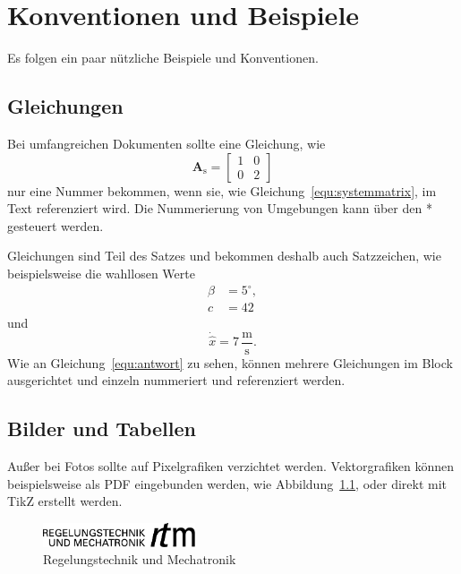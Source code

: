 \chapter{Konventionen und Beispiele}
Es folgen ein paar nützliche Beispiele und Konventionen.

\section{Gleichungen} \label{sec:gleichungen}
Bei umfangreichen Dokumenten sollte eine Gleichung, wie
%
\begin{equation} \label{equ:systemmatrix}
	\mathbf{A}_\mathrm{s} = \begin{bmatrix}1 & 0 \\ 0 & 2\end{bmatrix}
\end{equation}
%
nur eine Nummer bekommen, wenn sie, wie Gleichung~\eqref{equ:systemmatrix}, im Text referenziert wird. Die Nummerierung von Umgebungen kann über den * gesteuert werden.

Gleichungen sind Teil des Satzes und bekommen deshalb auch Satzzeichen, wie beispielsweise die wahllosen Werte
%
\begin{align}
	\beta &= 5^{\circ}, \nonumber  \\
	c &= 42 \label{equ:antwort} 
\end{align}
%
und
\begin{equation*}
	\dot{\hat{x}} = 7 \, \mathrm{\frac{m}{s}}.
\end{equation*}
Wie an Gleichung~\eqref{equ:antwort} zu sehen, können mehrere Gleichungen im Block ausgerichtet und einzeln nummeriert und referenziert werden.

\section{Bilder und Tabellen}
Außer bei Fotos sollte auf Pixelgrafiken verzichtet werden. Vektorgrafiken können beispielsweise als PDF eingebunden werden, wie Abbildung~\ref{fig:rtm}, oder direkt mit TikZ erstellt werden.

\begin{figure} %
	\centering
	\includegraphics[width=0.4\textwidth]{rtm_mit_schrift.pdf}
	\caption{Regelungstechnik und Mechatronik}
	\label{fig:rtm}
\end{figure}

